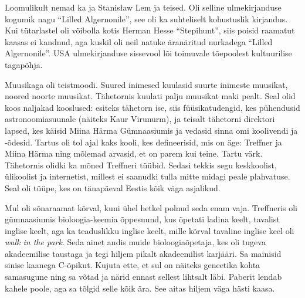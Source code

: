 Loomulikult nemad ka ja Stanisław Lem ja teised. Oli selline ulmekirjanduse kogumik nagu \enquote{Lilled 
Algernonile}, see oli ka suhteliselt kohustuslik kirjandus. Kui 
tütarlastel oli võibolla kotis Herman Hesse \enquote{Stepihunt}, siis poisid raamatut 
kaasas ei kandnud, aga kuskil oli neil natuke äranäritud nurkadega \enquote{Lilled 
Algernonile}. USA ulmekirjanduse sissevool lõi toimuvale tõepoolest 
kultuurilise tagapõhja.

Muusikaga oli teistmoodi. Suured inimesed kuulasid suurte inimeste 
muusikat, noored noorte muusikat. Tähetornis 
kuulati palju muusikat maki pealt. Seal olid koos naljakad 
kooslused: esiteks tähetorn ise, siis 
füüsikatudengid, kes pühendusid astronoomiasuunale (näiteks Kaur 
Virunurm), ja teisalt tähetorni 
direktori lapsed, kes käisid Miina Härma 
Gümnaasiumis ja vedasid sinna 
omi koolivendi ja -õdesid. 
Tartus oli tol ajal kaks kooli, kes defineerisid, mis on äge: 
Treffner ja Miina Härma ning mõlemad 
arvasid, et on parem kui teine. Tartu värk. Tähetornis olidki 
ka mõned Treffneri tüübid. Sedasi tekkis segu keskkoolist, 
ülikoolist ja internetist, millest ei saanudki tulla mitte midagi peale plahvatuse. Seal oli tüüpe, kes on tänapäeval Eestis kõik
väga asjalikud.


Mul oli sõnaraamat kõrval, kuni ühel hetkel polnud seda
enam vaja. Treffneris 
oli gümnaasiumis bioloogia-keemia õppesuund, kus õpetati ladina keelt, 
tavalist inglise keelt, aga ka teaduslikku inglise keelt, mille 
kõrval tavaline inglise keel oli \emph{walk in the park}. Seda ainet andis 
muide bioloogiaõpetaja, kes oli tugeva akadeemilise taustaga ja 
tegi hiljem pikalt akadeemilist karjääri. Sa 
mainisid sinise kaanega C-õpikut. Kujuta ette, et sul on näiteks geneetika 
kohta samasugune ning sa võtad ja närid ennast sellest lihtsalt läbi. Paberit lendab 
kahele poole, aga sa tõlgid selle kõik ära. See aitas hiljem väga hästi kaasa.

